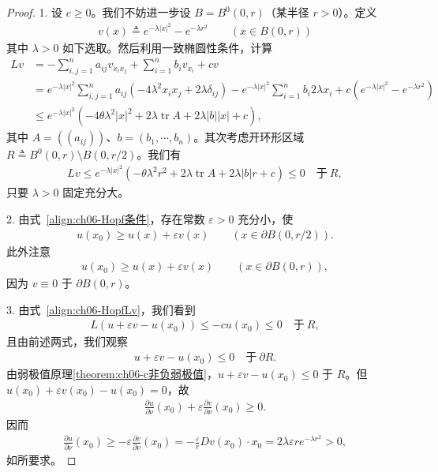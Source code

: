 \documentclass[../../main.tex]{subfiles}
\begin{document}
\begin{proof}
1. 设 $c\geqslant 0$。我们不妨进一步设 $B=B^{0}(0,r)$（某半径 $r>0$）。定义
\begin{align}
v(x)\triangleq e^{-\lambda|x|^{2}}-e^{-\lambda r^{2}}\qquad (x\in B(0,r))
\end{align}
其中 $\lambda>0$ 如下选取。然后利用一致椭圆性条件，计算
\begin{align*}
Lv&=-\sum_{i,j=1}^{n}a_{ij}v_{x_{i}x_{j}}+\sum_{i=1}^{n}b_{i}v_{x_{i}}+cv\\
&=e^{-\lambda|x|^{2}}\sum_{i,j=1}^{n}a_{ij}(-4\lambda^{2}x_{i}x_{j}+2\lambda\delta_{ij})
-e^{-\lambda|x|^{2}}\sum_{i=1}^{n}b_{i}2\lambda x_{i}
+c(e^{-\lambda|x|^{2}}-e^{-\lambda r^{2}})\\
&\leqslant e^{-\lambda|x|^{2}}(-4\theta\lambda^{2}|x|^{2}+2\lambda\operatorname{tr}A+2\lambda|b||x|+c),
\end{align*}
其中 $A=((a_{ij}))$、$b=(b_{1},\cdots,b_{n})$。其次考虑开环形区域 $R\triangleq B^{0}(0,r)\setminus B(0,r/2)$。我们有
\begin{align}
Lv\leqslant e^{-\lambda|x|^{2}}(-\theta\lambda^{2}r^{2}+2\lambda\operatorname{tr}A+2\lambda|b|r+c)\leqslant 0\quad\text{于}\ R,
\end{align}
只要 $\lambda>0$ 固定充分大。

2. 由式~\eqref{align:ch06-Hopf条件}，存在常数 $\varepsilon>0$ 充分小，使
\begin{align}
u(x_{0})\geqslant u(x)+\varepsilon v(x)\qquad (x\in\partial B(0,r/2)).
\end{align}
此外注意
\begin{align}
u(x_{0})\geqslant u(x)+\varepsilon v(x)\qquad (x\in\partial B(0,r)),
\end{align}
因为 $v\equiv 0$ 于 $\partial B(0,r)$。

3. 由式~\eqref{align:ch06-HopfLv}，我们看到
\begin{align*}
L(u+\varepsilon v-u(x_{0}))\leqslant-cu(x_{0})\leqslant 0\quad\text{于}\ R,
\end{align*}
且由前述两式，我们观察
\begin{align*}
u+\varepsilon v-u(x_{0})\leqslant 0\quad\text{于}\ \partial R.
\end{align*}
由弱极值原理\cref{theorem:ch06-c非负弱极值}，$u+\varepsilon v-u(x_{0})\leqslant 0$ 于 $R$。但 $u(x_{0})+\varepsilon v(x_{0})-u(x_{0})=0$，故
\begin{align*}
\frac{\partial u}{\partial\nu}(x_{0})+\varepsilon\frac{\partial v}{\partial\nu}(x_{0})\geqslant 0.
\end{align*}
因而
\begin{align*}
\frac{\partial u}{\partial\nu}(x_{0})\geqslant-\varepsilon\frac{\partial v}{\partial\nu}(x_{0})
=-\frac{\varepsilon}{r}Dv(x_{0})\cdot x_{0}
=2\lambda\varepsilon r e^{-\lambda r^{2}}>0,
\end{align*}
如所要求。
\end{proof}
\end{document}
